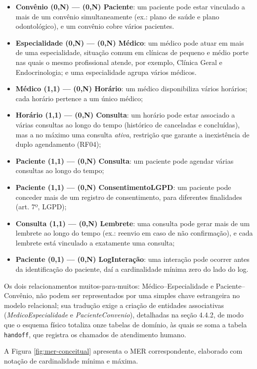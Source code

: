 \documentclass[12pt,a4paper]{extarticle}
\begin{document}
\begin{itemize}
    \item \textbf{Convênio (0,N) --- (0,N) Paciente}: um paciente pode estar vinculado a mais de um convênio simultaneamente (ex.: plano de saúde e plano odontológico), e um convênio cobre vários pacientes.
    \item \textbf{Especialidade (0,N) --- (0,N) Médico}: um médico pode atuar em mais de uma especialidade, situação comum em clínicas de pequeno e médio porte nas quais o mesmo profissional atende, por exemplo, Clínica Geral e Endocrinologia; e uma especialidade agrupa vários médicos.
    \item \textbf{Médico (1,1) --- (0,N) Horário}: um médico disponibiliza vários horários; cada horário pertence a um único médico;
    \item \textbf{Horário (1,1) --- (0,N) Consulta}: um horário pode estar associado a várias consultas ao longo do tempo (histórico de canceladas e concluídas), mas a no máximo uma consulta \textit{ativa}, restrição que garante a inexistência de duplo agendamento (RF04);
    \item \textbf{Paciente (1,1) --- (0,N) Consulta}: um paciente pode agendar várias consultas ao longo do tempo;
    \item \textbf{Paciente (1,1) --- (0,N) ConsentimentoLGPD}: um paciente pode conceder mais de um registro de consentimento, para diferentes finalidades (art. 7º, LGPD);
    \item \textbf{Consulta (1,1) --- (0,N) Lembrete}: uma consulta pode gerar mais de um lembrete ao longo do tempo (ex.: reenvio em caso de não confirmação), e cada lembrete está vinculado a exatamente uma consulta;
    \item \textbf{Paciente (0,1) --- (0,N) LogInteração}: uma interação pode ocorrer antes da identificação do paciente, daí a cardinalidade mínima zero do lado do log.
\end{itemize}

Os dois relacionamentos muitos-para-muitos: Médico–Especialidade e Paciente–Convênio, não podem ser representados por uma simples chave estrangeira no modelo relacional; sua tradução exige a criação de entidades associativas (\textit{MedicoEspecialidade} e \textit{PacienteConvenio}), detalhadas na seção 4.4.2, de modo que o esquema físico totaliza onze tabelas de domínio, às quais se soma a tabela \texttt{handoff}, que registra os chamados de atendimento humano.

A Figura \ref{fig:mer-conceitual} apresenta o MER correspondente, elaborado com notação de cardinalidade mínima e máxima.
\end{document}
